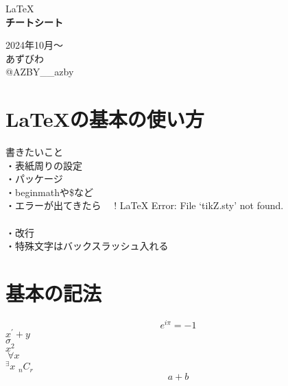 \documentclass[11pt,a4j]{jreport}
\begin{document}

\thispagestyle{empty}
\begin{center}

\vspace{20mm}
{\Large\noindent \LaTeX}\\
\vspace{40mm}
{\huge\noindent\textbf{チートシート}}\\
\medskip
\vspace{\baselineskip}
\vspace{30mm}

{\Large\noindent
2024年10月〜\\
\vspace{\baselineskip}
あずびわ\\
@AZBY__azby\\
}
\vspace{40mm}

\end{center}

\thispagestyle{empty}
\clearpage


\tableofcontents
\thispagestyle{fancy}
\pagestyle{fancy}
\lhead{\rightmark}
\renewcommand{\chaptermark}[1]{\markboth{第\ \normalfont\thechapter\ 章~~#1}{}}
\thispagestyle{fancy}
\chapter{LaTeXの基本の使い方}
書きたいこと\\
・表紙周りの設定\\
・パッケージ\\
・beginmathや\$など\\
・エラーが出てきたら　
! LaTeX Error: File `tikZ.sty' not found.\\
\\
・改行\\
・特殊文字はバックスラッシュ入れる\\

\chapter{基本の記法}
\thispagestyle{fancy}
\begin{equation}
e^{i\pi}=-1
\end{equation}
$x^{\prime}+y$\\
$\sigma$\\
$x^{2}$\\
${}~{\forall}x$\\
${}^{\exists}x$
${}_{n}C_{r}$\\
\begin{equation}
a+b
\end{equation}
\end{document}
